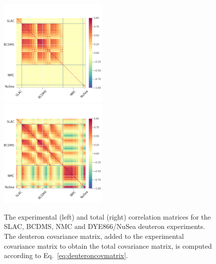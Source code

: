 \documentclass[11pt,a4paper]{article}
\begin{document}
\begin{figure}[!t]
  \centering
  \includegraphics[width=0.47\textwidth]{plots/covmats_experiment_global_proton.png} \ \ \ \ \
  \includegraphics[width=0.47\textwidth]{plots/covmats_total_global_proton.png}
  \caption{The experimental (left) and total (right) correlation matrices for
    the SLAC, BCDMS, NMC and DYE866/NuSea deuteron experiments. The deuteron
    covariance matrix, added to the experimental covariance matrix to obtain
    the total covariance matrix, is computed according to
    Eq.~\eqref{eq:deuteroncovmatrix}.}
  \label{fig:correlation}
\end{figure}
\end{document}
